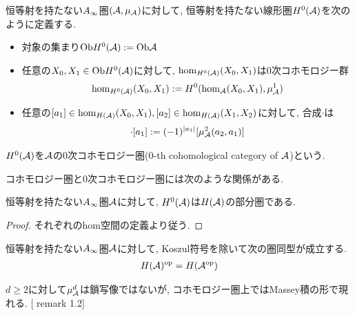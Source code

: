 \documentclass[uplatex, a4paper, 14Q, dvipdfmx]{jsarticle}
\begin{document}
\begin{definition}[$0$次コホモロジー圏]
  恒等射を持たない$A_{\infty}$圏$(\mathcal{A},\mu_{\mathcal{A}})$に対して, 恒等射を持たない線形圏$H^0(\mathcal{A})$を次のように定義する. 
  \begin{itemize}
    \item 対象の集まり$\mathrm{Ob} H^0(\mathcal{A}) := \mathrm{Ob}\mathcal{A}$
    \item 任意の$X_0, X_1 \in \mathrm{Ob} H^0(\mathcal{A})$に対して, $\hom_{H^0(\mathcal{A})}(X_0,X_1)$は$0$次コホモロジー群
    \begin{align*}
      \hom_{H^0(\mathcal{A})}(X_0,X_1) := H^0(\hom_{\mathcal{A}}(X_0,X_1), \mu^1_{\mathcal{A}})
    \end{align*}
    \item 任意の$[a_1] \in \hom_{H(\mathcal{A})}(X_0,X_1), [a_2] \in \hom_{H(\mathcal{A})}(X_1,X_2)$に対して, 合成$\cdot$は
    \begin{align*}
      [a_2] \cdot [a_1] := (-1)^{|a_1|} [\mu^2_\A(a_2,a_1)]
    \end{align*}
  \end{itemize}
  $H^0(\mathcal{A})$を$\mathcal{A}$の$0$次コホモロジー圏($0$-th cohomological category of $\mathcal{A}$)という. 
\end{definition}

コホモロジー圏と$0$次コホモロジー圏には次のような関係がある. 

\begin{lemma}
  恒等射を持たない$A_{\infty}$圏$\mathcal{A}$に対して, $H^0(\mathcal{A})$は$H(\mathcal{A})$の部分圏である.
\end{lemma}

\begin{proof}
  それぞれのhom空間の定義より従う. 
\end{proof}

\begin{lemma}
  恒等射を持たない$A_{\infty}$圏$\mathcal{A}$に対して, Koszul符号を除いて次の圏同型が成立する. 
  \begin{align*}
    H(\mathcal{A})^{\mathrm{op}} = H(\mathcal{A}^\mathrm{op})
  \end{align*}
\end{lemma}

$d \geq 2$に対して$\mu^d_{\mathcal{A}}$は鎖写像ではないが, コホモロジー圏上ではMassey積の形で現れる. [\cite{Sei} remark 1.2] 
\end{document}
